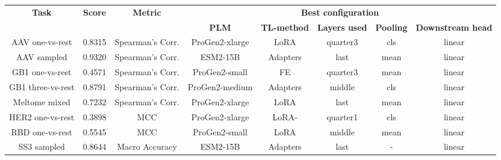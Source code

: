 \documentclass{standalone}
\begin{document}
\begin{tabular}{c|ccccccc}
\hline
\multirow{2}{*}{\textbf{Task}} & \multicolumn{1}{c|}{\multirow{2}{*}{\textbf{Score}}} & \multicolumn{1}{c|}{\multirow{2}{*}{\textbf{Metric}}} & \multicolumn{5}{c}{\textbf{Best configuration}} \\ \cline{4-8}
 & \multicolumn{1}{c|}{} & \multicolumn{1}{c|}{} & \textbf{PLM} & \textbf{TL-method} & \textbf{Layers used} & \textbf{Pooling} & \textbf{Downstream head} \\ \hline
AAV one-vs-rest & 0.8315 & Spearman's Corr. & ProGen2-xlarge & LoRA & quarter3 & cls & linear \\ \hline
AAV sampled & 0.9320 & Spearman's Corr. & ESM2-15B & Adapters & last & mean & linear \\ \hline
GB1 one-vs-rest & 0.4571 & Spearman's Corr. & ProGen2-small & FE & quarter3 & mean & linear \\ \hline
GB1 three-vs-rest & 0.8791 & Spearman's Corr. & ProGen2-medium & Adapters & middle & cls & linear \\ \hline
Meltome mixed & 0.7232 & Spearman's Corr. & ProGen2-xlarge & LoRA & last & mean & linear \\ \hline
HER2 one-vs-rest & 0.3898 & MCC & ProGen2-xlarge & LoRA- & quarter1 & cls & linear \\ \hline
RBD one-vs-rest & 0.5545 & MCC & ProGen2-small & LoRA & middle & mean & linear \\ \hline
SS3 sampled & 0.8644 & Macro Accuracy & ESM2-15B & Adapters & last & - & linear \\ \hline
\end{tabular}
\end{document}
